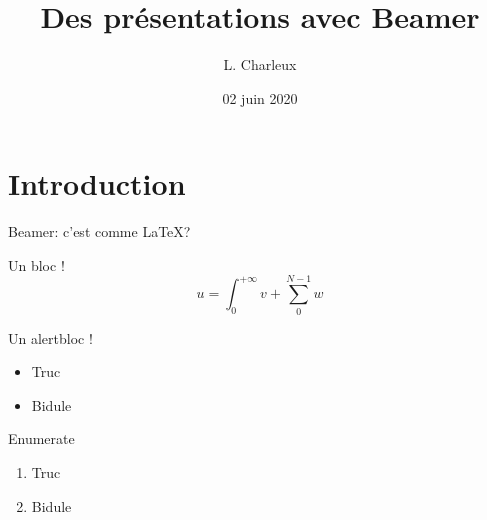 \documentclass[11pt]{beamer}
\author{L. Charleux}
\title{ Des présentations avec Beamer}
\institute{USMB}
\date{02 juin 2020}
\begin{document}
\begin{frame}
\titlepage
\end{frame}

\begin{frame}
\tableofcontents
\end{frame}

\section{Introduction}
\begin{frame}{Beamer: c'est comme \LaTeX ?}
\begin{block}{Un bloc !}
$$
u = \int_0^{+\infty}v + \sum_0^{N-1} w
$$
\end{block}

\begin{alertblock}{Un alertbloc !}
\begin{itemize}
\item Truc
\item Bidule
\end{itemize}
\end{alertblock}

\begin{alertblock}{Enumerate}
\begin{enumerate}
\item Truc
\item Bidule
\end{enumerate}

\end{alertblock}


\end{frame}
\end{document}
